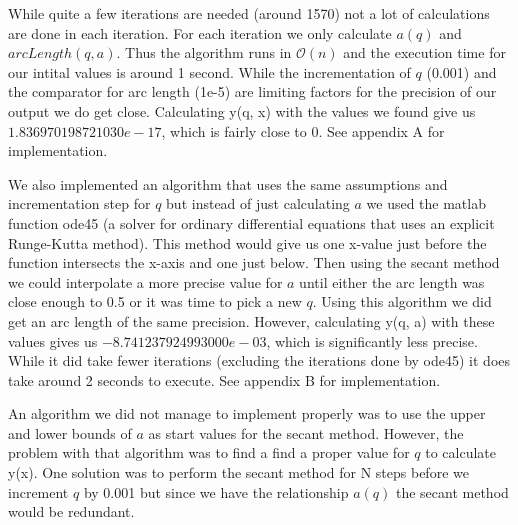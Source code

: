 While quite a few iterations are needed (around 1570) not a lot of calculations are done in each iteration. For each iteration we only calculate $a(q)$ and $arcLength(q, a)$. Thus the algorithm runs in $\mathcal{O}(n)$ and the execution time for our intital values is around 1 second. While the incrementation of $q$ (0.001) and the comparator for arc length (1e-5) are limiting factors for the precision of our output we do get close. Calculating y(q, x) with the values we found give us $1.836970198721030e-17$, which is fairly close to 0. See appendix A for implementation.

We also implemented an algorithm that uses the same assumptions and incrementation step for $q$ but instead of just calculating $a$ we used the matlab function ode45 (a solver for ordinary differential equations that uses an explicit Runge-Kutta method). This method would give us one x-value just before the function intersects the x-axis and one just below. Then using the secant method we could interpolate a more precise value for $a$ until either the arc length was close enough to 0.5 or it was time to pick a new $q$. Using this algorithm we did get an arc length of the same precision. However, calculating y(q, a) with these values gives us $-8.741237924993000e-03$, which is significantly less precise. While it did take fewer iterations (excluding the iterations done by ode45) it does take around 2 seconds to execute. See appendix B for implementation.

An algorithm we did not manage to implement properly was to use the upper and lower bounds of $a$ as start values for the secant method. However, the problem with that algorithm was to find a find a proper value for $q$ to calculate y(x). One solution was to perform the secant method for N steps before we increment $q$ by 0.001 but since we have the relationship $a(q)$ the secant method would be redundant.
